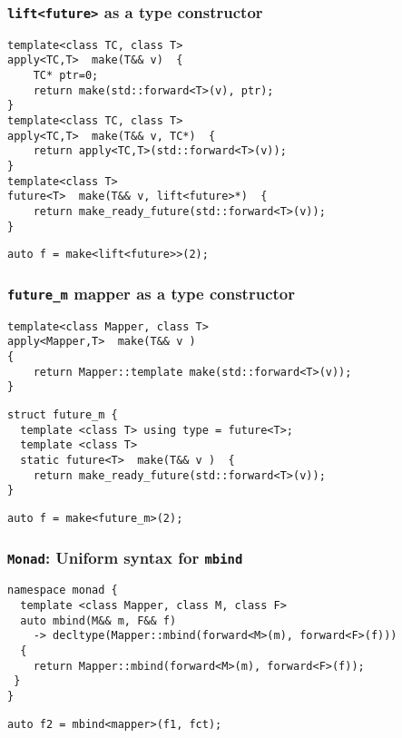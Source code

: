 \documentclass[xcolor=dvipsnames]{beamer}
\newcommand{\cpp}[1]{\lstinline{#1}}
\begin{document}
\begin{frame}[fragile]
\frametitle{\cpp{lift<future>} as a type constructor}

\begin{lstlisting}
template<class TC, class T>
apply<TC,T>  make(T&& v)  {
    TC* ptr=0; 
    return make(std::forward<T>(v), ptr);
}
template<class TC, class T>
apply<TC,T>  make(T&& v, TC*)  {
    return apply<TC,T>(std::forward<T>(v));
}
template<class T>
future<T>  make(T&& v, lift<future>*)  {
    return make_ready_future(std::forward<T>(v));
}
\end{lstlisting}
\begin{lstlisting}
auto f = make<lift<future>>(2); 
\end{lstlisting}

\end{frame}
\begin{frame}[fragile]
\frametitle{\cpp{future_m} mapper as a type constructor}

\begin{lstlisting}
template<class Mapper, class T>
apply<Mapper,T>  make(T&& v )  
{
    return Mapper::template make(std::forward<T>(v));
}
\end{lstlisting}
\begin{lstlisting}
struct future_m {
  template <class T> using type = future<T>;
  template <class T> 
  static future<T>  make(T&& v )  {
    return make_ready_future(std::forward<T>(v));
}
\end{lstlisting}
\begin{lstlisting}
auto f = make<future_m>(2); 
\end{lstlisting}

\end{frame}
\begin{frame}[fragile]
\frametitle{\cpp{Monad}: Uniform syntax for \cpp{mbind}}

\begin{lstlisting}
namespace monad {
  template <class Mapper, class M, class F>
  auto mbind(M&& m, F&& f)
    -> decltype(Mapper::mbind(forward<M>(m), forward<F>(f)))
  {
    return Mapper::mbind(forward<M>(m), forward<F>(f));
 }
}
\end{lstlisting}

\begin{lstlisting}
auto f2 = mbind<mapper>(f1, fct); 
\end{lstlisting}

\end{frame}
\end{document}

